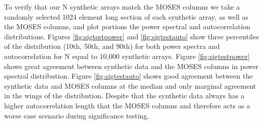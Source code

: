 \documentclass[]{solarphysics}
\begin{document}
\begin{article}
	To verify that our N synthetic arrays match the MOSES columns we take a randomly selected 1024 element long section of each synthetic array, as well as the MOSES columns, and plot portions the power spectral and autocorrelation distributions. Figures \ref{fig:sigtestpower} and \ref{fig:sigtestauto}  show three percentiles of the distribution (10th, 50th, and 90th) for both power spectra and autocorrelation for N equal to 10,000 synthetic arrays. Figure \ref{fig:sigtestpower} shows great agreement between synthetic data and the MOSES columns in power spectral distribution.  Figure \ref{fig:sigtestauto} shows good agreement between the synthetic data and MOSES columns at the median and only marginal agreement in the wings of the distribution.  Despite that the synthetic data always has a higher autocorrelation length that the MOSES columns and therefore acts as a worse case scenario during significance testing.  
		

\end{article}
\end{document}
